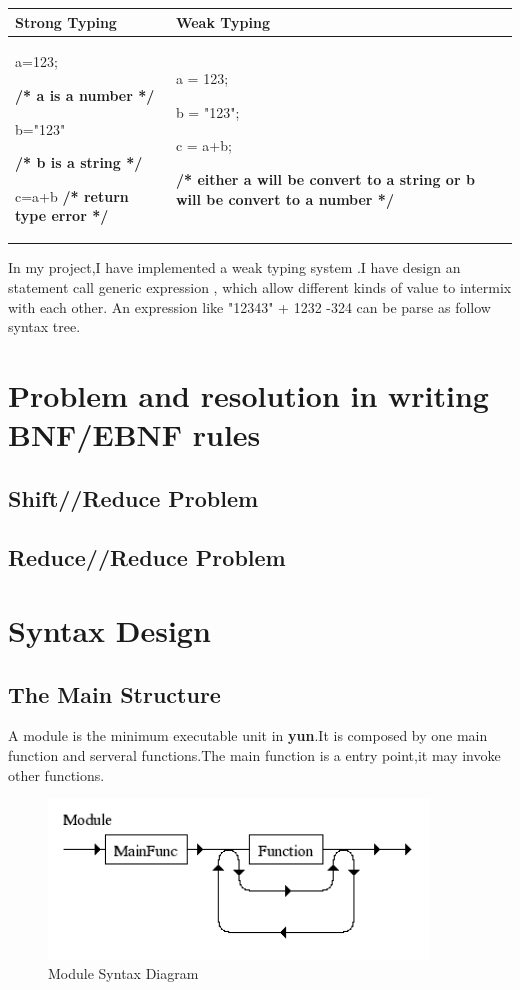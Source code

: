 \begin{tabular}{p{6cm}|p{6cm}}
\hline Strong Typing & Weak Typing  \\ 
\hline a=123; \par 
\textbf{/* a is a number */} \par 
b="123" \par  
\textbf{/* b is a string */} \par 
c=a+b \textbf{/* return type error */}  &  
a = 123; \par 
b = "123"; \par
c = a+b; \par 
\textbf{/* either a will be convert to a string or b will be convert to a number */}

\\ 
\hline 
\end{tabular} 

In my project,I have implemented a weak typing system .I have design an statement call generic expression , which allow different kinds of value to intermix with each other. An expression like "12343" + 1232 -324 can be parse as follow syntax tree.




\section{Problem and resolution in writing BNF/EBNF rules}
\subsection{Shift//Reduce Problem}

\subsection{Reduce//Reduce Problem}

\section{Syntax Design}

\subsection{The Main Structure}
A module is the minimum executable unit in \textbf{yun}.It is composed by one main function and serveral functions.The main function is a entry point,it may invoke other functions.

\begin{figure}[h!]
  \centering
	\includegraphics[width=0.90\textwidth]{pic/c4/module.png}
	\caption{Module Syntax Diagram}
\end{figure}

